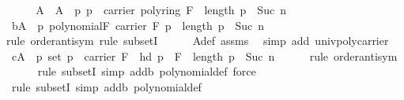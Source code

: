 \begin{isabellebody}
%
\isadelimproof
%
\endisadelimproof
%
\isatagproof
{}\isamarkupfalse%
\ {\isacharminus}{\kern0pt}\isanewline
\ \ \isamarkupfalse%
\ A\ \ {\isachardoublequoteopen}A\ {\isacharequal}{\kern0pt}\ {\isacharbraceleft}{\kern0pt}p{\isachardot}{\kern0pt}\ p\ {\isasymin}\ {\isacharparenleft}{\kern0pt}carrier\ {\isacharparenleft}{\kern0pt}poly{\isacharunderscore}{\kern0pt}ring\ F{\isacharparenright}{\kern0pt}{\isacharparenright}{\kern0pt}\ {\isasymand}\ length\ p\ {\isacharequal}{\kern0pt}\ Suc\ n{\isacharbraceright}{\kern0pt}{\isachardoublequoteclose}\isanewline
\ \ \isamarkupfalse%
\ b{\isacharcolon}{\kern0pt}{\isachardoublequoteopen}A\ {\isacharequal}{\kern0pt}\ {\isacharbraceleft}{\kern0pt}p{\isachardot}{\kern0pt}\ polynomial\isactrlbsub F\isactrlesub \ {\isacharparenleft}{\kern0pt}carrier\ F{\isacharparenright}{\kern0pt}\ p\ {\isasymand}\ length\ p\ {\isacharequal}{\kern0pt}\ Suc\ n{\isacharbraceright}{\kern0pt}{\isachardoublequoteclose}\isanewline
\ \ \ \ \isamarkupfalse%
{\isacharparenleft}{\kern0pt}rule\ order{\isacharunderscore}{\kern0pt}antisym{\isacharcomma}{\kern0pt}\ rule\ subsetI{\isacharparenright}{\kern0pt}\isanewline
\ \ \ \ \isamarkupfalse%
\ A{\isacharunderscore}{\kern0pt}def\ assms{\isacharparenleft}{\kern0pt}{}{\isacharparenright}{\kern0pt}\ \isamarkupfalse%
\ {\isacharparenleft}{\kern0pt}simp\ add{\isacharcolon}{\kern0pt}\ univ{\isacharunderscore}{\kern0pt}poly{\isacharunderscore}{\kern0pt}carrier{\isacharparenright}{\kern0pt}{\isacharplus}{\kern0pt}\isanewline
\ \ \isamarkupfalse%
\ c{\isacharcolon}{\kern0pt}{\isachardoublequoteopen}A\ {\isacharequal}{\kern0pt}\ {\isacharbraceleft}{\kern0pt}p{\isachardot}{\kern0pt}\ set\ p\ {\isasymsubseteq}\ carrier\ F\ {\isasymand}\ hd\ p\ {\isasymnoteq}\ {\isasymzero}\isactrlbsub F\isactrlesub \ {\isasymand}\ length\ p\ {\isacharequal}{\kern0pt}\ Suc\ n{\isacharbraceright}{\kern0pt}{\isachardoublequoteclose}\isanewline
\ \ \ \ \isamarkupfalse%
\ {\isacharparenleft}{\kern0pt}rule\ order{\isacharunderscore}{\kern0pt}antisym{\isacharparenright}{\kern0pt}\isanewline
\ \ \ \ \isamarkupfalse%
\ {\isacharparenleft}{\kern0pt}rule\ subsetI{\isacharcomma}{\kern0pt}\ simp\ add{\isacharcolon}{\kern0pt}b\ polynomial{\isacharunderscore}{\kern0pt}def{\isacharcomma}{\kern0pt}\ force{\isacharparenright}{\kern0pt}\isanewline
\ \ \ \ \isamarkupfalse%
\ {\isacharparenleft}{\kern0pt}rule\ subsetI{\isacharcomma}{\kern0pt}\ simp\ add{\isacharcolon}{\kern0pt}b\ polynomial{\isacharunderscore}{\kern0pt}def{\isacharparenright}{\kern0pt}\isanewline

\end{isabellebody}
